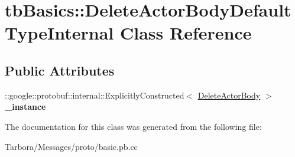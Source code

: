 \hypertarget{classtbBasics_1_1DeleteActorBodyDefaultTypeInternal}{}\section{tb\+Basics\+:\+:Delete\+Actor\+Body\+Default\+Type\+Internal Class Reference}
\label{classtbBasics_1_1DeleteActorBodyDefaultTypeInternal}
\subsection*{Public Attributes}
\begin{DoxyCompactItemize}
\item 
\mbox{\label{classtbBasics_1_1DeleteActorBodyDefaultTypeInternal_a9849e40231a4c4887de49bcb323b4b06}} 
\+::google\+::protobuf\+::internal\+::\+Explicitly\+Constructed$<$ \hyperlink{classtbBasics_1_1DeleteActorBody}{Delete\+Actor\+Body} $>$ {\bfseries \+\_\+instance}
\end{DoxyCompactItemize}


The documentation for this class was generated from the following file\+:\begin{DoxyCompactItemize}
\item 
Tarbora/\+Messages/proto/basic.\+pb.\+cc\end{DoxyCompactItemize}
